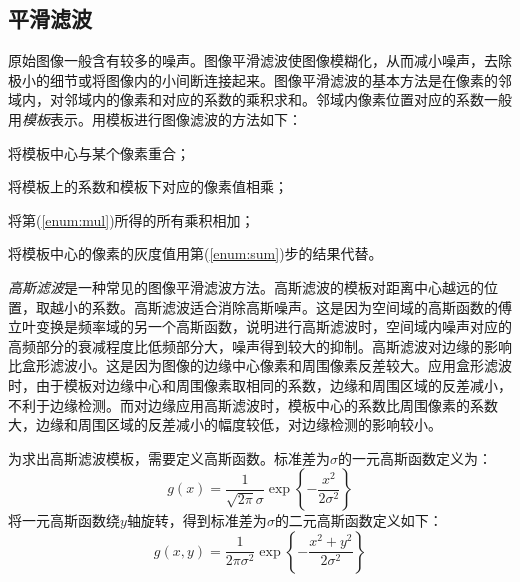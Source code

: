 \subsection{平滑滤波}

原始图像一般含有较多的噪声。图像平滑滤波使图像模糊化，从而减小噪声，去除极小的细节或将图像内的小间断连接起来。图像平滑滤波的基本方法是在像素的邻域内，对邻域内的像素和对应的系数的乘积求和。邻域内像素位置对应的系数一般用\emph{模板}表示。用模板进行图像滤波的方法如下：
\begin{asparaenum}[(1)]
\item 将模板中心与某个像素重合；
\item\label{enum:mul} 将模板上的系数和模板下对应的像素值相乘；
\item\label{enum:sum} 将第(\ref{enum:mul})所得的所有乘积相加；
\item 将模板中心的像素的灰度值用第(\ref{enum:sum})步的结果代替。
\end{asparaenum}



\emph{高斯滤波}是一种常见的图像平滑滤波方法。高斯滤波的模板对距离中心越远的位置，取越小的系数。高斯滤波适合消除高斯噪声。这是因为空间域的高斯函数的傅立叶变换是频率域的另一个高斯函数，说明进行高斯滤波时，空间域内噪声对应的高频部分的衰减程度比低频部分大，噪声得到较大的抑制。高斯滤波对边缘的影响比盒形滤波小。这是因为图像的边缘中心像素和周围像素反差较大。应用盒形滤波时，由于模板对边缘中心和周围像素取相同的系数，边缘和周围区域的反差减小，不利于边缘检测。而对边缘应用高斯滤波时，模板中心的系数比周围像素的系数大，边缘和周围区域的反差减小的幅度较低，对边缘检测的影响较小。

为求出高斯滤波模板，需要定义高斯函数。标准差为$\sigma$的一元高斯函数定义为：
\begin{equation}
  \label{eq:gauss1}
  g(x)=\frac{1}{\sqrt{2\pi}\sigma}\exp\left\{-\frac{x^2}{2\sigma^2}\right\}
\end{equation}
将一元高斯函数绕$y$轴旋转，得到标准差为$\sigma$的二元高斯函数定义如下：
\begin{equation}
  \label{eq:gauss2}
  g(x,y)=\frac{1}{2\pi\sigma^2}\exp\left\{-\frac{x^2+y^2}{2\sigma^2}\right\}
\end{equation}

